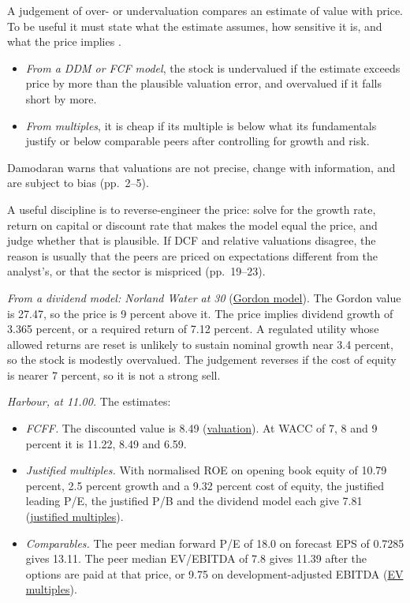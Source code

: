 \begin{qfmethod}\label{meth:valuation-price-judgement}
 A judgement of over- or undervaluation compares an estimate of value with price. To be useful it must state what the estimate assumes, how sensitive it is, and what the price implies \citep[pp.~1--5, 466]{investment-valuation-2012}.
\begin{itemize}
\item \emph{From a DDM or FCF model}, the stock is undervalued if the estimate exceeds price by more than the plausible valuation error, and overvalued if it falls short by more.
\item \emph{From multiples}, it is cheap if its multiple is below what its fundamentals justify or below comparable peers after controlling for growth and risk.
\end{itemize}
Damodaran warns that valuations are not precise, change with information, and are subject to bias (pp.~2--5).

A useful discipline is to reverse-engineer the price: solve for the growth rate, return on capital or discount rate that makes the model equal the price, and judge whether that is plausible. If DCF and relative valuations disagree, the reason is usually that the peers are priced on expectations different from the analyst's, or that the sector is mispriced (pp.~19--23).

 \emph{From a dividend model: Norland Water at 30} (\hyperref[meth:gordon-growth-model]{Gordon model}). The Gordon value is 27.47, so the price is 9 percent above it. The price implies dividend growth of 3.365 percent, or a required return of 7.12 percent. A regulated utility whose allowed returns are reset is unlikely to sustain nominal growth near 3.4 percent, so the stock is modestly overvalued. The judgement reverses if the cost of equity is nearer 7 percent, so it is not a strong sell.

\emph{Harbour, at 11.00.} The estimates:
\begin{itemize}
\item \emph{FCFF.} The discounted value is 8.49 (\hyperref[meth:forecast-horizon-steady-state]{valuation}). At WACC of 7, 8 and 9 percent it is 11.22, 8.49 and 6.59.
\item \emph{Justified multiples.} With normalised ROE on opening book equity of 10.79 percent, 2.5 percent growth and a 9.32 percent cost of equity, the justified leading P/E, the justified P/B and the dividend model each give 7.81 (\hyperref[meth:justified-multiples]{justified multiples}).
\item \emph{Comparables.} The peer median forward P/E of 18.0 on forecast EPS of 0.7285 gives 13.11. The peer median EV/EBITDA of 7.8 gives 11.39 after the options are paid at that price, or 9.75 on development-adjusted EBITDA (\hyperref[meth:enterprise-value-multiples]{EV multiples}).
\end{itemize}


\end{qfmethod}
